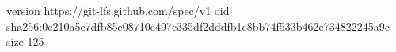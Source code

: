 version https://git-lfs.github.com/spec/v1
oid sha256:0c210a5e7dfb85e08710e497c335df2dddfb1c8bb74f533b462e734822245a9c
size 125
